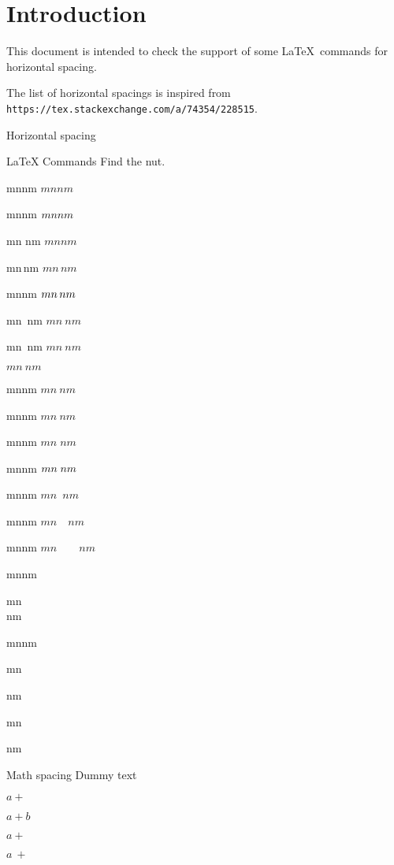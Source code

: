 \documentclass{article}
\begin{document}
\section*{Introduction}

This document is intended to check the support of some \LaTeX\ commands for 
horizontal spacing.

The list of horizontal spacings is inspired from 
\texttt{https://tex.stackexchange.com/a/74354/228515}.

\begin{quiz}[points=1]{Horizontal spacing}
\begin{multi}[shuffle=false]{LaTeX Commands}
Find the nut.
\item mnnm \quad $mnnm$
\item mn\space nm \quad $mn\space nm$
\item mn nm \quad $mn nm$
\item mn\,nm \quad $mn\,nm$
\item mn\thinspace nm \quad $ mn\thinspace nm$
\item mn~nm \quad $mn~nm$
\item mn\ nm \quad $mn\ nm$
\item $mn\>nm$ %
\item mn\:nm \quad $mn\:nm$
\item mn\medspace nm \quad $mn\medspace nm$
\item mn\;nm \quad $mn\;nm$
\item mn\thickspace nm \quad $mn\thickspace nm$
\item* mn\enspace nm \quad $mn\enspace nm$
\item mn\quad nm \quad $mn\quad nm$
\item mn\qquad nm \quad $mn\qquad nm$
\item mn\textvisiblespace nm
\item mn\\nm
\item mn\newline nm
\item mn%

nm
\item mn\par nm
\end{multi}
\begin{multi}[shuffle=false]{Math spacing}
Dummy text{}
\item $a+$
\item $a+b$
\item* $a+{}$
\item $a\ +$
\end{multi}
\end{quiz}
\end{document}
